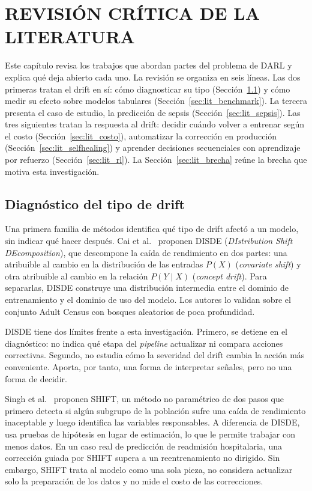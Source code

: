 \chapter{REVISIÓN CRÍTICA DE LA LITERATURA}

Este capítulo revisa los trabajos que abordan partes del problema de DARL y explica qué
deja abierto cada uno. La revisión se organiza en seis líneas. Las dos primeras tratan el
drift en sí: cómo diagnosticar su tipo (Sección~\ref{sec:lit_diagnostico}) y cómo medir su
efecto sobre modelos tabulares (Sección~\ref{sec:lit_benchmark}). La tercera presenta el
caso de estudio, la predicción de sepsis (Sección~\ref{sec:lit_sepsis}). Las tres
siguientes tratan la respuesta al drift: decidir cuándo volver a entrenar según el costo
(Sección~\ref{sec:lit_costo}), automatizar la corrección en producción
(Sección~\ref{sec:lit_selfhealing}) y aprender decisiones secuenciales con aprendizaje por
refuerzo (Sección~\ref{sec:lit_rl}). La Sección~\ref{sec:lit_brecha} reúne la brecha que
motiva esta investigación.

\section{Diagnóstico del tipo de drift}
\label{sec:lit_diagnostico}

Una primera familia de métodos identifica qué tipo de drift afectó a un modelo, sin indicar
qué hacer después. Cai et al.~\cite{cai2023disde} proponen DISDE (\textit{DIstribution Shift
DEcomposition}), que descompone la caída de rendimiento en dos partes: una atribuible al
cambio en la distribución de las entradas $P(X)$ (\textit{covariate shift}) y otra
atribuible al cambio en la relación $P(Y \mid X)$ (\textit{concept drift}). Para separarlas,
DISDE construye una distribución intermedia entre el dominio de entrenamiento y el dominio
de uso del modelo. Los autores lo validan sobre el conjunto Adult Census con bosques
aleatorios de poca profundidad.

DISDE tiene dos límites frente a esta investigación. Primero, se detiene en el diagnóstico:
no indica qué etapa del \textit{pipeline} actualizar ni compara acciones correctivas.
Segundo, no estudia cómo la severidad del drift cambia la acción más conveniente. Aporta,
por tanto, una forma de interpretar señales, pero no una forma de decidir.

Singh et al.~\cite{singh2025shift} proponen SHIFT, un método no paramétrico de dos pasos que
primero detecta si algún subgrupo de la población sufre una caída de rendimiento
inaceptable y luego identifica las variables responsables. A diferencia de DISDE, usa
pruebas de hipótesis en lugar de estimación, lo que le permite trabajar con menos datos. En
un caso real de predicción de readmisión hospitalaria, una corrección guiada por SHIFT
supera a un reentrenamiento no dirigido. Sin embargo, SHIFT trata al modelo como una sola
pieza, no considera actualizar solo la preparación de los datos y no mide el costo de las
correcciones.

